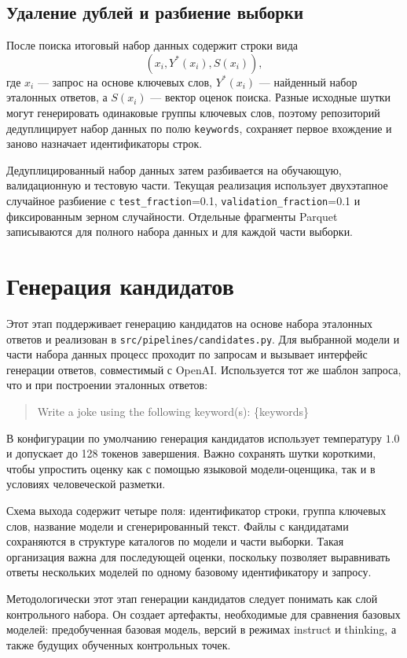 \subsection{Удаление дублей и разбиение выборки}

После поиска итоговый набор данных содержит строки вида
\[
 (x_i, Y^{*}(x_i), S(x_i)),
\]
где \(x_i\) --- запрос на основе ключевых слов, \(Y^{*}(x_i)\) --- найденный набор эталонных ответов, а \(S(x_i)\) --- вектор оценок поиска. Разные исходные шутки могут генерировать одинаковые группы ключевых слов, поэтому репозиторий дедуплицирует набор данных по полю \texttt{keywords}, сохраняет первое вхождение и заново назначает идентификаторы строк.

Дедуплицированный набор данных затем разбивается на обучающую, валидационную и тестовую части. Текущая реализация использует двухэтапное случайное разбиение с \texttt{test\_fraction}=0.1, \texttt{validation\_fraction}=0.1 и фиксированным зерном случайности. Отдельные фрагменты Parquet записываются для полного набора данных и для каждой части выборки.

\section{Генерация кандидатов}

Этот этап поддерживает генерацию кандидатов на основе набора эталонных ответов и реализован в \texttt{src/pipelines/candidates.py}. Для выбранной модели и части набора данных процесс проходит по запросам и вызывает интерфейс генерации ответов, совместимый с OpenAI. Используется тот же шаблон запроса, что и при построении эталонных ответов:
\begin{quote}
 \ttfamily
 Write a joke using the following keyword(s): \{keywords\}
\end{quote}
В конфигурации по умолчанию генерация кандидатов использует температуру \(1.0\) и допускает до 128 токенов завершения. Важно сохранять шутки короткими, чтобы упростить оценку как с помощью языковой модели-оценщика, так и в условиях человеческой разметки.

Схема выхода содержит четыре поля: идентификатор строки, группа ключевых слов, название модели и сгенерированный текст. Файлы с кандидатами сохраняются в структуре каталогов по модели и части выборки. Такая организация важна для последующей оценки, поскольку позволяет выравнивать ответы нескольких моделей по одному базовому идентификатору и запросу.

Методологически этот этап генерации кандидатов следует понимать как слой контрольного набора. Он создает артефакты, необходимые для сравнения базовых моделей: предобученная базовая модель, версий в режимах instruct и thinking, а также будущих обученных контрольных точек.

